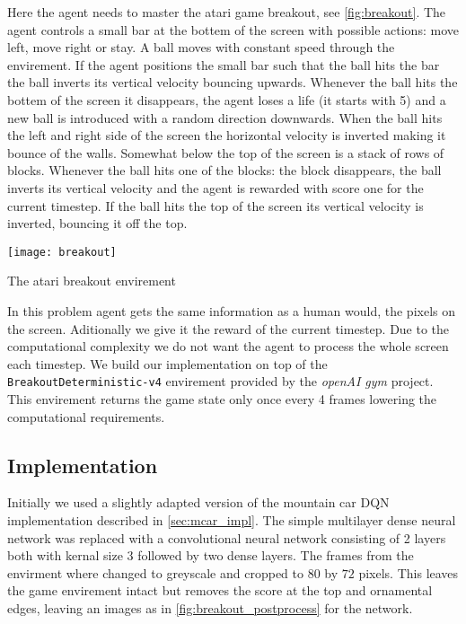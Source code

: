 \label{sec:breakout}
Here the agent needs to master the atari game breakout, see \autoref{fig:breakout}. The agent controls a small bar at the bottem of the screen with possible actions: move left, move right or stay. A ball moves with constant speed through the envirement. If the agent positions the small bar such that the ball hits the bar the ball inverts its vertical velocity bouncing upwards. Whenever the ball hits the bottem of the screen it disappears, the agent loses a life (it starts with 5) and a new ball is introduced with a random direction downwards. When the ball hits the left and right side of the screen the horizontal velocity is inverted making it bounce of the walls. Somewhat below the top of the screen is a stack of rows of blocks. Whenever the ball hits one of the blocks: the block disappears, the ball inverts its vertical velocity and the agent is rewarded with score one for the current timestep. If the ball hits the top of the screen its vertical velocity is inverted, bouncing it off the top. 

\begin{marginfigure}
    \texttt{[image: breakout]}
    \caption{The atari breakout envirement}
    \label{fig:breakout}
\end{marginfigure}

In this problem agent gets the same information as a human would, the pixels on the screen. Aditionally we give it the reward of the current timestep. Due to the computational complexity we do not want the agent to process the whole screen each timestep. We build our implementation on top of the \texttt{BreakoutDeterministic-v4} envirement provided by the \textit{openAI gym} project. This envirement returns the game state only once every 4 frames lowering the computational requirements.

\subsection{Implementation}
Initially we used a slightly adapted version of the mountain car DQN implementation described in \autoref{sec:mcar_impl}. The simple multilayer dense neural network was replaced with a convolutional neural network consisting of 2 layers both with kernal size 3 followed by two dense layers. The frames from the envirment where changed to greyscale and cropped to $80$ by $72$ pixels. This leaves the game envirement intact but removes the score at the top and ornamental edges, leaving an images as in \autoref{fig:breakout_postprocess} for the network.

